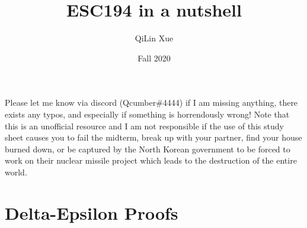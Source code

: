 \documentclass{article}
\title{ESC194 in a nutshell}
\author{QiLin Xue}
\date{Fall 2020}
\begin{document}
\maketitle
Please let me know via discord (Qcumber\#4444) if I am missing anything, there exists any typos, and especially if something is horrendously wrong! Note that this is an unofficial resource and I am not responsible if the use of this study sheet causes you to fail the midterm, break up with your partner, find your house burned down, or be captured by the North Korean government to be forced to work on their nuclear missile project which leads to the destruction of the entire world.
\tableofcontents
\printindex

\newpage
\section{Delta-Epsilon Proofs}
\end{document}
